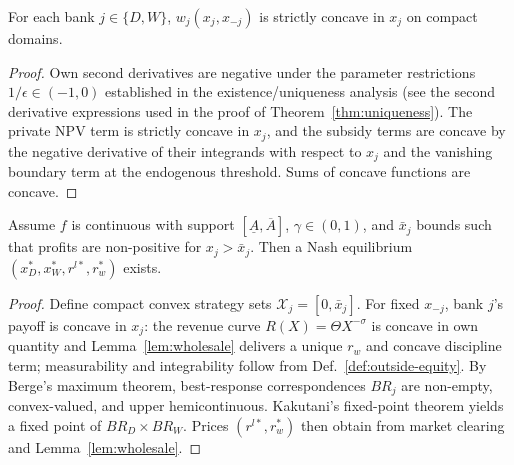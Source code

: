 \documentclass[12pt]{article}
\begin{document}
\begin{lemma}\label{lem:concavity-own}
For each bank $j\in\{D,W\}$, $w_j(x_j,x_{-j})$ is strictly concave in $x_j$ on compact domains.
\end{lemma}
\begin{proof}
Own second derivatives are negative under the parameter restrictions $1/\epsilon\in(-1,0)$ established in the existence/uniqueness analysis (see the second derivative expressions used in the proof of Theorem~\ref{thm:uniqueness}). The private NPV term is strictly concave in $x_j$, and the subsidy terms are concave by the negative derivative of their integrands with respect to $x_j$ and the vanishing boundary term at the endogenous threshold. Sums of concave functions are concave.
\end{proof}

\begin{theorem}\label{thm:existence}
Assume $f$ is continuous with support $[\underline A,\overline A]$, $\gamma\in(0,1)$, and $\bar x_j$ bounds such that profits are non-positive for $x_j>\bar x_j$. Then a Nash equilibrium $(x_D^*,x_W^*,r^{l*},r_w^*)$ exists.
\end{theorem}
\begin{proof}
Define compact convex strategy sets $\mathcal X_j=[0,\bar x_j]$. For fixed $x_{-j}$, bank $j$'s payoff is concave in $x_j$: the revenue curve $R(X)=\Theta X^{-\sigma}$ is concave in own quantity and Lemma~\ref{lem:wholesale} delivers a unique $r_w$ and concave discipline term; measurability and integrability follow from Def.~\ref{def:outside-equity}. By Berge's maximum theorem, best-response correspondences $BR_j$ are non-empty, convex-valued, and upper hemicontinuous. Kakutani's fixed-point theorem yields a fixed point of $BR_D\times BR_W$. Prices $(r^{l*},r_w^*)$ then obtain from market clearing and Lemma~\ref{lem:wholesale}.
\end{proof}
\end{document}
